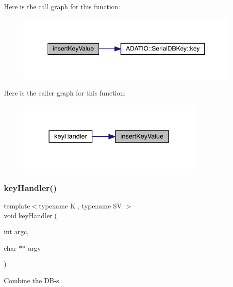 Here is the call graph for this function\+:
\nopagebreak
\begin{figure}[H]
\begin{center}
\leavevmode
\includegraphics[width=334pt]{d2/d95/adat-devel_2main_2dbutil_2dbavgsrc_8cc_a8dcef9d29a9dfc5045f4ee378e94fca3_cgraph}
\end{center}
\end{figure}
Here is the caller graph for this function\+:
\nopagebreak
\begin{figure}[H]
\begin{center}
\leavevmode
\includegraphics[width=265pt]{d2/d95/adat-devel_2main_2dbutil_2dbavgsrc_8cc_a8dcef9d29a9dfc5045f4ee378e94fca3_icgraph}
\end{center}
\end{figure}
\mbox{\label{adat-devel_2main_2dbutil_2dbavgsrc_8cc_a57918e290614430413950cb4fdfd967e}} 
\subsubsection{\texorpdfstring{keyHandler()}{keyHandler()}}
{\footnotesize\ttfamily template$<$typename K , typename SV $>$ \\
void key\+Handler (\begin{DoxyParamCaption}\item[{int}]{argc,  }\item[{char $\ast$$\ast$}]{argv }\end{DoxyParamCaption})}



Combine the D\+B-\/s. 

